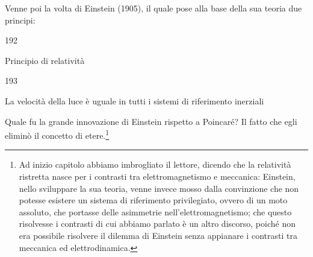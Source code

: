 Venne poi la volta di Einstein (1905), il quale pose alla base della
sua teoria due principi:
\begin{dinglist}{192}
\item Principio di relativit\`a
\end{dinglist}
\begin{dinglist}{193}
\item La velocit\`a della luce \`e uguale in tutti i sistemi di
  riferimento inerziali
\end{dinglist}
Quale fu la grande innovazione di Einstein rispetto a Poincar\'e?  Il
fatto che egli elimin\`o il concetto di etere.\footnote{Ad inizio
  capitolo abbiamo imbrogliato il lettore, dicendo che la relativit\`a
  ristretta nasce per i contrasti tra elettromagnetismo e meccanica:
  Einstein, nello sviluppare la sua teoria, venne invece mosso dalla
  convinzione che non potesse esistere un sistema di riferimento
  privilegiato, ovvero di un moto assoluto, che portasse delle
  asimmetrie nell'elettromagnetismo; che questo risolvesse i contrasti
  di cui abbiamo parlato \`e un altro discorso, poich\'e non era
  possibile risolvere il dilemma di Einstein senza appianare i
  contrasti tra meccanica ed elettrodinamica.}


